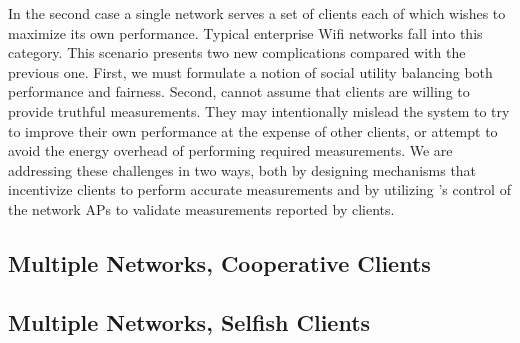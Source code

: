 In the second case a single network serves a set of clients each of which
wishes to maximize its own performance. Typical enterprise Wifi networks fall
into this category. This scenario presents two new complications compared
with the previous one. First, we must formulate a notion of social utility
balancing both performance and fairness. Second, \PS{} cannot assume that
clients are willing to provide truthful measurements. They may intentionally
mislead the system to try to improve their own performance at the expense of
other clients, or attempt to avoid the energy overhead of performing required
measurements. We are addressing these challenges in two ways, both by
designing mechanisms that incentivize clients to perform accurate
measurements and by utilizing \PS{}'s control of the network APs to validate
measurements reported by clients.

\subsection{Multiple Networks, Cooperative Clients}

\subsection{Multiple Networks, Selfish Clients}
